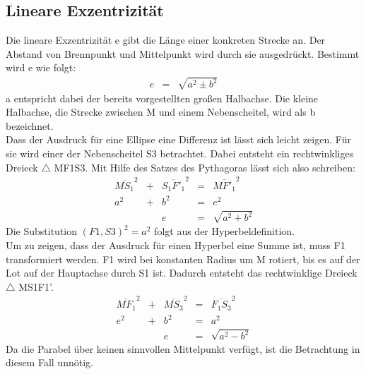 \subsection{Lineare Exzentrizität}
Die lineare Exzentrizität e gibt die Länge einer konkreten Strecke an. Der Abstand von Brennpunkt und Mittelpunkt wird durch sie ausgedrückt. Bestimmt wird e wie folgt:
\begin{displaymath}
	\begin{array}{rcl}
		e & = & \sqrt{a^2\pm b^2}
	\end{array}
\end{displaymath}
a entspricht dabei der bereits vorgestellten großen Halbachse. Die kleine Halbachse, die Strecke zwischen M und einem Nebenscheitel, wird als b bezeichnet.\\
Dass der Ausdruck für eine Ellipse eine Differenz ist lässt sich leicht zeigen. Für sie wird einer der Nebenscheitel S3 betrachtet. Dabei entsteht ein rechtwinkliges Dreieck $\triangle$ MF1S3. Mit Hilfe des Satzes des Pythagoras lässt sich also schreiben:
\begin{displaymath}
	\begin{array}{ccccl}
		\overline{M{S}_1}^2 & + & \overline{{S}_1{F'}_1}^2 & = & \overline{M{F'}_1}^2\\
		a^2 & + & b^2 & = & e^2\\
		&& e & = & \sqrt{a^2+b^2}
	\end{array}
\end{displaymath}
Die Substitution $(F1,S3)^2 = a^2$ folgt aus der Hyperbeldefinition.\\
Um zu zeigen, dass der Ausdruck für einen Hyperbel eine Summe ist, muss F1 transformiert werden. F1 wird bei konstanten Radius um M rotiert, bis es auf der Lot auf der Hauptachse durch S1 ist. Dadurch entsteht das rechtwinklige Dreieck $\triangle$ MS1F1'.
\begin{displaymath}
	\begin{array}{ccccl}
		\overline{M{F}_1}^2 & + & \overline{M{S}_3}^2 & = & \overline{{F}_1{S}_3}^2\\
		e^2 & + & b^2 & = & a^2\\
		&& e & = & \sqrt{a^2-b^2}
	\end{array}
\end{displaymath}
Da die Parabel über keinen sinnvollen Mittelpunkt verfügt, ist die Betrachtung in diesem Fall unnötig.\\
